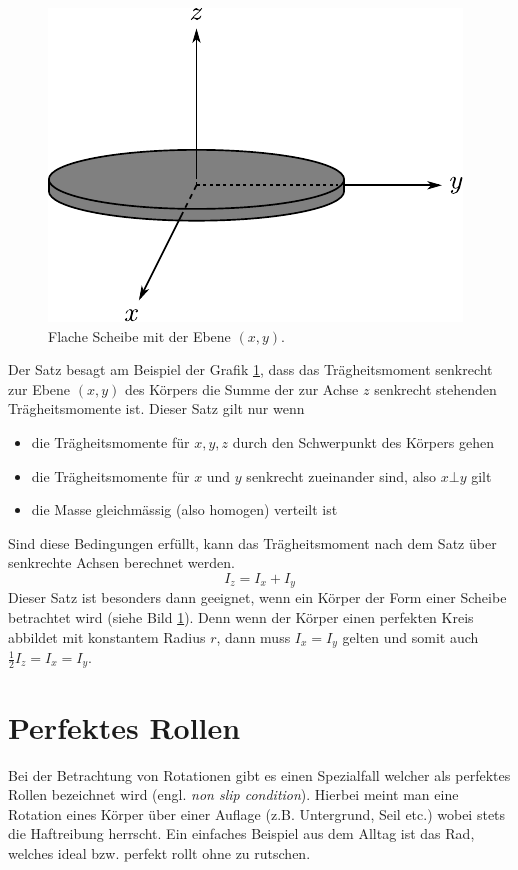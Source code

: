\begin{figure}[h!]
	\centering
	\includegraphics[scale=0.8]{steiner2.pdf}
	\caption{Flache Scheibe mit der Ebene $(x,y)$.}
	\label{fig:steiner2}
\end{figure}

\noindent
Der Satz besagt am Beispiel der Grafik \ref{fig:steiner2}, 
dass das Trägheitsmoment senkrecht zur Ebene $(x,y)$ des 
Körpers die Summe der zur Achse $z$ senkrecht stehenden Trägheitsmomente 
ist. Dieser Satz gilt nur wenn
\begin{itemize}
	\item die Trägheitsmomente für $x,y,z$ durch den Schwerpunkt des 
		Körpers gehen
	\item die Trägheitsmomente für $x$ und $y$ senkrecht zueinander 
		sind, also $x \bot y$ gilt
	\item die Masse gleichmässig (also homogen) verteilt ist
\end{itemize}
Sind diese Bedingungen erfüllt, kann das Trägheitsmoment nach dem Satz
über senkrechte Achsen berechnet werden.
\[ \boxed{I_z = I_x + I_y} \]
Dieser Satz ist besonders dann geeignet, wenn ein Körper der Form einer
Scheibe betrachtet wird (siehe Bild \ref{fig:steiner2}). 
Denn wenn der Körper einen perfekten Kreis abbildet mit konstantem 
Radius $r$, dann muss $I_x = I_y$ gelten und somit auch 
$\frac{1}{2} I_z = I_x = I_y$.

\newpage
\section{Perfektes Rollen}\label{sec:non-slip}
Bei der Betrachtung von Rotationen gibt es einen Spezialfall welcher
als perfektes Rollen bezeichnet wird (engl. \textit{non slip condition}).
Hierbei meint man eine Rotation eines Körper über einer Auflage (z.B. 
Untergrund, Seil etc.) wobei stets die Haftreibung herrscht. 
Ein einfaches Beispiel aus dem Alltag ist das Rad, welches ideal bzw. 
perfekt rollt ohne zu rutschen.

